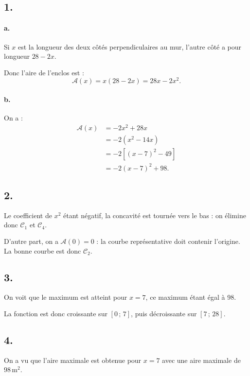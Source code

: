 \subsection*{1.}

\paragraph{a.} Si \( x \) est la longueur des deux côtés perpendiculaires au mur, l'autre côté a pour longueur \( 28 - 2x \).

Donc l'aire de l'enclos est :
\[
\mathcal{A}(x) = x(28 - 2x) = 28x - 2x^2.
\]

\paragraph{b.} On a :
\begin{align*}
\mathcal{A}(x) &= -2x^2 + 28x \\
&= -2 \left(x^2 - 14x\right) \\
&= -2 \left[(x - 7)^2 - 49\right] \\
&= -2(x - 7)^2 + 98.
\end{align*}

\subsection*{2.}

Le coefficient de \( x^2 \) étant négatif, la concavité est tournée vers le bas : on élimine donc \( \mathcal{C}_1 \) et \( \mathcal{C}_4 \).

D'autre part, on a \( \mathcal{A}(0) = 0 \) : la courbe représentative doit contenir l'origine. La bonne courbe est donc \( \mathcal{C}_2 \).

\subsection*{3.}

On voit que le maximum est atteint pour \( x = 7 \), ce maximum étant égal à 98.

La fonction est donc croissante sur \( [0 \,;\, 7] \), puis décroissante sur \( [7 \,;\, 28] \).

\begin{center}
\end{center}

\subsection*{4.}

On a vu que l'aire maximale est obtenue pour \( x = 7 \) avec une aire maximale de \( 98 \, \text{m}^2 \).

